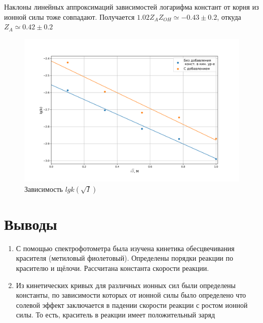 \documentclass[a4paper, 12pt]{article}
\begin{document}
Наклоны линейных аппроксимаций зависимостей логарифма констант от корня из ионной силы тоже совпадают. Получается $1.02 Z_A Z_{OH} \simeq -0.43 \pm 0.2$, откуда  $Z_A \simeq 0.42 \pm 0.2$

 \begin{figure}[h!]
    \begin{center}
    \includegraphics[width=1\textwidth]{fig3.3.png}
    \end{center}
    \caption{Зависимость $lgk(\sqrt I)$}
\end{figure}


\newpage
 \section{Выводы}
\begin{enumerate}
    \item С помощью спектрофотометра была изучена кинетика обесцвечивания красителя (метиловый фиолетовый). Определены порядки реакции по красителю и щёлочи. Рассчитана константа скорости реакции.
    \item Из кинетических кривых для различных ионных сил были определены константы, по зависимости которых от ионной силы было определено что солевой эффект заключается в падении скорости реакции с ростом ионной силы. То есть, краситель в реакции имеет положительный заряд

\end{enumerate}
\end{document}
